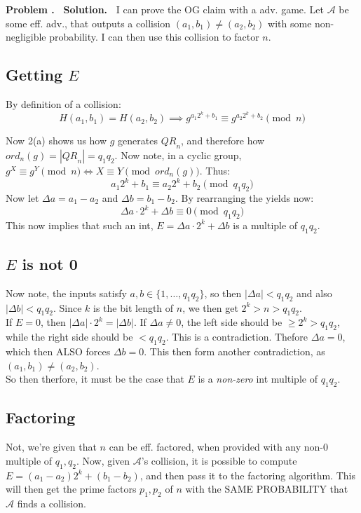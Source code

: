 \documentclass[12pt]{article}
\theoremstyle{definition}
\newcommand{\addbigskip}{\addvspace{\bigskipamount}}
\newcounter{problemnum}
\newenvironment{problem}
     {\addbigskip \setcounter{partnum}{0}
      \noindent\stepcounter{problemnum}\textbf{Problem
                                             \arabic{problemnum}.\ }}
     {\par\addbigskip}
\newenvironment{solution}
     {\addbigskip
      \noindent\color{blue}\textbf{Solution.\ }}
     {\par\addbigskip}
\newenvironment{solution}
     {\comment}
     {\endcomment}
\newcounter{partnum}
\newcommand{\qrn}{\mathit{QR}_n}
\newcommand{\A}{\mathcal{A}}
\begin{document}
\begin{problem}
\begin{solution}
I can prove the OG claim with a adv. game. Let $\A$ be some eff. adv., that outputs a collision $(a_1, b_1) \neq (a_2, b_2)$ with some non-negligible probability. I can then use this collision to factor $n$.

\subsection*{Getting $E$}
By definition of a collision:
\begin{equation*}
H(a_1, b_1) = H(a_2, b_2) \implies g^{a_1 2^k + b_1} \equiv g^{a_2 2^k + b_2} \pmod n
\end{equation*}

\noindent Now 2(a) shows us how $g$ generates $\qrn$, and therefore how $ord_n(g) = |\qrn| = q_1 q_2$. Now note, in a cyclic group, $g^X \equiv g^Y \pmod n \iff X \equiv Y \pmod{ord_n (g)}$. Thus:
\begin{equation*}
a_1 2^k + b_1 \equiv a_2 2^k + b_2 \pmod{q_1 q_2}
\end{equation*}
Now let $\Delta a = a_1 - a_2$ and $\Delta b = b_1 - b_2$. By rearranging the yields now:
\begin{equation*}
\Delta a \cdot 2^k + \Delta b \equiv 0 \pmod{q_1 q_2}
\end{equation*}
This now implies that such an int, $E = \Delta a \cdot 2^k + \Delta b$ is a multiple of $q_1 q_2$.

\subsection*{$E$ is not 0}
Now note, the inputs satisfy $a, b \in \{1, \dots, q_1 q_2\}$, so then $|\Delta a| < q_1 q_2$ and also $|\Delta b| < q_1 q_2$. Since $k$ is the bit length of $n$, we then get $2^k > n > q_1 q_2$.\\
\indent If $E = 0$, then $|\Delta a| \cdot 2^k = |\Delta b|$. If $\Delta a \neq 0$, the left side should be $\ge 2^k > q_1 q_2$, while the right side should be $< q_1 q_2$. This is a contradiction. Thefore $\Delta a = 0$, which then ALSO forces $\Delta b = 0$. This then form another contradiction, as $(a_1, b_1) \neq (a_2, b_2)$.\\
\indent So then therfore, it must be the case that $E$ is a \textit{non-zero} int multiple of $q_1 q_2$.

\subsection*{Factoring}
Not, we're given that $n$ can be eff. factored, when provided with any non-0 multiple of $q_1, q_2$. Now, given $\A$'s collision, it is possible to compute $E = (a_1 - a_2)2^k + (b_1 - b_2)$, and then pass it to the factoring algorithm. This will then get the prime factors $p_1, p_2$ of $n$ with the SAME PROBABILITY that $\A$ finds a collision.


\end{solution}
\end{problem}
\end{document}

